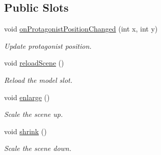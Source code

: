\subsection*{Public Slots}
\begin{DoxyCompactItemize}
\item 
void \hyperlink{classWorldGraphicsView_afe30c74f794ae1b385ca3a89cb9ede25}{on\+Protagonist\+Position\+Changed} (int x, int y)
\begin{DoxyCompactList}\small\item\em Update protagonist position. \end{DoxyCompactList}\item 
void \hyperlink{classWorldGraphicsView_a8bdead6606060dc49a5faa5464d94c8d}{reload\+Scene} ()
\begin{DoxyCompactList}\small\item\em Reload the model slot. \end{DoxyCompactList}\item 
void \hyperlink{classWorldGraphicsView_a57c88f9c11bd3bc2df3aeba015d8ca67}{enlarge} ()\hypertarget{classWorldGraphicsView_a57c88f9c11bd3bc2df3aeba015d8ca67}{}\label{classWorldGraphicsView_a57c88f9c11bd3bc2df3aeba015d8ca67}

\begin{DoxyCompactList}\small\item\em Scale the scene up. \end{DoxyCompactList}\item 
void \hyperlink{classWorldGraphicsView_a87a8d6055562a76d6e7e3b61832497cf}{shrink} ()\hypertarget{classWorldGraphicsView_a87a8d6055562a76d6e7e3b61832497cf}{}\label{classWorldGraphicsView_a87a8d6055562a76d6e7e3b61832497cf}

\begin{DoxyCompactList}\small\item\em Scale the scene down. \end{DoxyCompactList}\end{DoxyCompactItemize}
